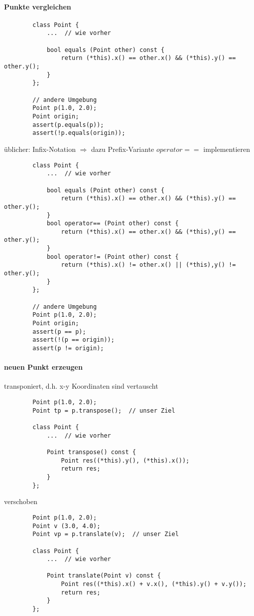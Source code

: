 \documentclass{article}
\begin{document}
\paragraph{Punkte vergleichen}

	\begin{lstlisting}
		class Point {
			...  // wie vorher

			bool equals (Point other) const {
			    return (*this).x() == other.x() && (*this).y() == other.y();
			}
		};

		// andere Umgebung
		Point p(1.0, 2.0);
		Point origin;
		assert(p.equals(p));
		assert(!p.equals(origin));
	\end{lstlisting}

		üblicher: Infix-Notation $\Rightarrow $ dazu Prefix-Variante $operator ==$ implementieren
	\begin{lstlisting}
		class Point {
			...  // wie vorher

			bool equals (Point other) const {
			    return (*this).x() == other.x() && (*this).y() == other.y();
			}
			bool operator== (Point other) const {
				return (*this).x() == other.x() && (*this),y() == other.y();
			}
			bool operator!= (Point other) const {
				return (*this).x() != other.x() || (*this),y() != other.y();
			}
		};

		// andere Umgebung
		Point p(1.0, 2.0);
		Point origin;
		assert(p == p);
		assert(!(p == origin));
		assert(p != origin);
	\end{lstlisting}

\paragraph{neuen Punkt erzeugen}
	transponiert, d.h. x-y Koordinaten sind vertauscht
	\begin{lstlisting}
		Point p(1.0, 2.0);
		Point tp = p.transpose();  // unser Ziel
	
		class Point {
			...  // wie vorher

			Point transpose() const {
				Point res((*this).y(), (*this).x());
				return res;
			}
		};
	\end{lstlisting}
	verschoben
	\begin{lstlisting}
		Point p(1.0, 2.0);
		Point v (3.0, 4.0);
		Point vp = p.translate(v);  // unser Ziel
	
		class Point {
			...  // wie vorher

			Point translate(Point v) const {
				Point res((*this).x() + v.x(), (*this).y() + v.y());
				return res;
			}
		};
	\end{lstlisting}
\end{document}
